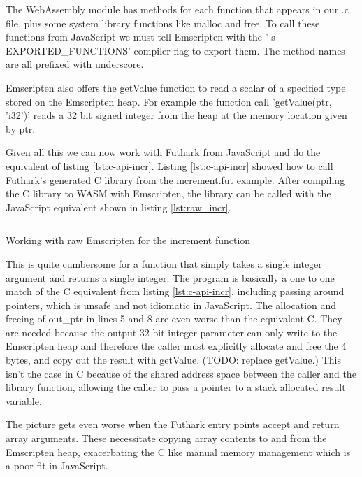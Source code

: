 \documentclass[11pt]{book}
\begin{document}
The WebAssembly module has methods for each function that appears in our .c file, plus some system library functions like malloc and free. To call these functions from JavaScript we must tell Emscripten with the '-s EXPORTED\_FUNCTIONS' compiler flag to export them. The method names are all prefixed with underscore.


Emscripten also offers the getValue function to read a scalar of a specified type stored on the Emscripten heap. For example the function call 'getValue(ptr, 'i32')' reads a 32 bit signed integer from the heap at the memory location given by ptr.






Given all this we can now work with Futhark from JavaScript and do the equivalent of listing \ref{lst:c-api-incr}. Listing \ref{lst:c-api-incr} showed how to call Futhark's generated C library from the increment.fut example. After compiling the C library to WASM with Emscripten, the library can be called with the JavaScript equivalent shown in listing \ref{lst:raw_incr}.

\begin{listing}[H] 
        \inputminted[fontsize=\small,baselinestretch=0.5,linenos]{JavaScript}{code/compiler/api_examples/raw_incr.js}
        \caption{Working with raw Emscripten for the increment function}
        \label{lst:raw_incr}    
\end{listing} 

This is quite cumbersome for a function that simply takes a single integer argument and returns a single integer.
The program is basically a one to one match of the C equivalent from listing \ref{lst:c-api-incr}, including passing around pointers, which is unsafe and not idiomatic in JavaScript.
The allocation and freeing of out\_ptr in lines 5 and 8 are even worse than the equivalent C. They are needed because the output 32-bit integer parameter can only write to the Emscripten heap and therefore the caller must explicitly allocate and free the 4 bytes, and copy out the result with getValue. (TODO: replace getValue.) This isn't the case in C because of the shared address space between the caller and the library function, allowing the caller to pass a pointer to a stack allocated result variable.

The picture gets even worse when the Futhark entry points accept and return array arguments.
These necessitate copying array contents to and from the Emscripten heap, exacerbating the C like manual memory management which is a poor fit in JavaScript. 
\end{document}
